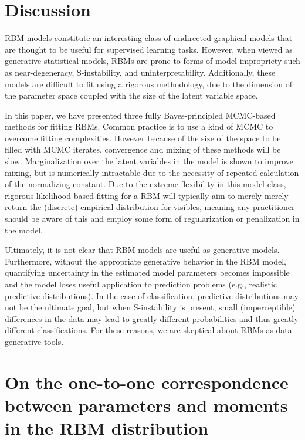 \documentclass[12pt]{article}
\theoremstyle{definition}
\begin{document}
\section{Discussion}\label{discussion}

RBM models constitute an interesting class of undirected graphical
models that are thought to be useful for supervised learning tasks.
However, when viewed as generative statistical models, RBMs are prone to
forms of model impropriety such as near-degeneracy, S-instability, and
uninterpretability. Additionally, these models are difficult to fit
using a rigorous methodology, due to the dimension of the parameter
space coupled with the size of the latent variable space.

In this paper, we have presented three fully Bayes-principled MCMC-based
methods for fitting RBMs. Common practice is to use a kind of MCMC to
overcome fitting complexities. However because of the size of the space
to be filled with MCMC iterates, convergence and mixing of these methods
will be slow. Marginalization over the latent variables in the model is
shown to improve mixing, but is numerically intractable due to the
necessity of repeated calculation of the normalizing constant. Due to
the extreme flexibility in this model class, rigorous likelihood-based
fitting for a RBM will typically aim to merely merely return the
(discrete) empirical distribution for visibles, meaning any practitioner
should be aware of this and employ some form of regularization or
penalization in the model.

Ultimately, it is not clear that RBM models are useful as generative
models. Furthermore, without the appropriate generative behavior in the
RBM model, quantifying uncertainty in the estimated model parameters
becomes impossible and the model loses useful application to prediction
problems (e.g., realistic predictive distributions). In the case of
classification, predictive distributions may not be the ultimate goal,
but when S-instability is present, small (imperceptible) differences in
the data may lead to greatly different probabilities and thus greatly
different classifications. For these reasons, we are skeptical about
RBMs as data generative tools.

\clearpage

\appendix


\section{On the one-to-one correspondence between parameters and moments
in the RBM distribution}\label{appendix-rbm}
\end{document}
